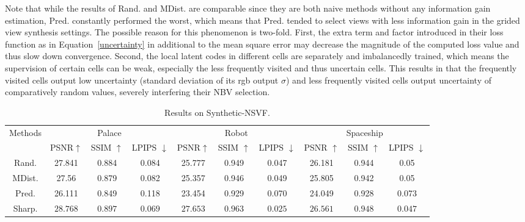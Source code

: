 Note that while the results of Rand. and MDist. are comparable since they are both naive methods without any information gain estimation, Pred. constantly performed the worst, which means that Pred. tended to select views with less information gain in the grided view synthesis settings.
The possible reason for this phenomenon is two-fold.
First, the extra term and factor introduced in their loss function as in Equation~\ref{uncertainty} in additional to the mean square error may decrease the magnitude of the computed loss value and thus slow down convergence.
Second, the local latent codes in different cells are separately and imbalancedly trained, which means the supervision of certain cells can be weak, especially the less frequently visited and thus uncertain cells.
This results in that the frequently visited cells output low uncertainty (standard deviation of its rgb output $\sigma$) and less frequently visited cells output uncertainty of comparatively random values, severely interfering their NBV selection.



\begin{table}[h!]
    \centering
    \caption{Results on Synthetic-NSVF. }
    \begin{tabular}{|c|c|c|c|c|c|c|c|c|c|}
        \hline
        \multirow{2}{*}{Methods} & \multicolumn{3}{c|}{Palace} &  \multicolumn{3}{c|}{Robot} &  \multicolumn{3}{c|}{Spaceship} \\ \cline{2-10}
         & PSNR$\uparrow$ & SSIM $\uparrow$& LPIPS $\downarrow$ & PSNR$\uparrow$ & SSIM $\uparrow$& LPIPS $\downarrow$& PSNR $\uparrow$& SSIM $\uparrow$& LPIPS $\downarrow$

         \\ \hline Rand.  & 27.841 & 0.884 & 0.084 & 25.777 & 0.949 & 0.047 & 26.181 & 0.944 & 0.05
         \\ \hline MDist.  & 27.56 & 0.879 & 0.082 & 25.357 & 0.946 & 0.049 & 25.805 & 0.942 & 0.05
         \\ \hline Pred.  & 26.111 & 0.849 & 0.118 & 23.454 & 0.929 & 0.070 & 24.049 & 0.928 & 0.073
         \\ \hline Sharp.  & $\bm{28.768}$ & $\bm{0.897}$ & $\bm{0.069}$ & $\bm{27.653}$ & $\bm{0.963}$ & $\bm{0.025}$ & $\bm{26.561}$ & $\bm{0.948}$ & $\bm{0.047}$
         \\ \hline
    \end{tabular}
    \label{nsvf}
\end{table}


